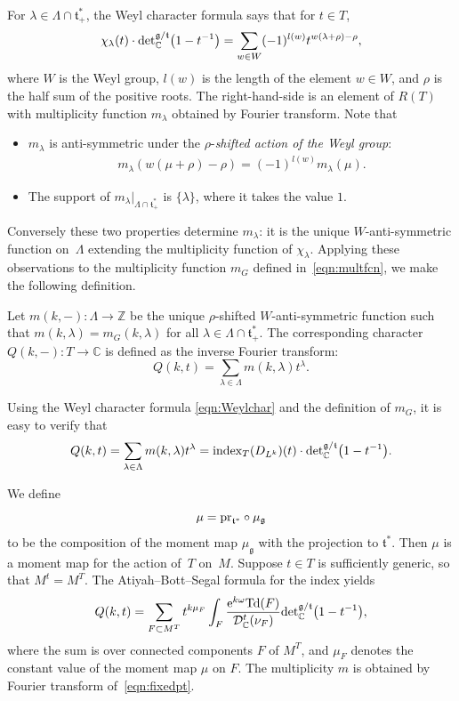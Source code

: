\documentclass[11pt]{article}
\numberwithin{equation}{section}
\newcommand{\tn}[1]{\textnormal{#1}}
\def\g{\ensuremath{\mathfrak{g}}}
\def\t{\ensuremath{\mathfrak{t}}}
\def\bC{\ensuremath{\mathbb{C}}}
\def\bZ{\ensuremath{\mathbb{Z}}}
\def\pr{\ensuremath{\textnormal{pr}}}
\def\index{\ensuremath{\textnormal{index}}}
\def\Td{\ensuremath{\textnormal{Td}}}
\def\calDC{\ensuremath{\mathcal{D}_{\bC}}}
\def\de{\ensuremath{\tn{det}_\bC}}
\begin{document}
For $\lambda \in \Lambda\cap \t_+^\ast$, the Weyl character formula says that for $t \in T$,
\begin{gather}\label{eqn:Weylchar}
\chi_\lambda(t) \cdot \de^{\g/\t}\big(1-t^{-1}\big)=\sum_{w\in W} (-1)^{l(w)}t^{w(\lambda+\rho)-\rho},
\end{gather}
where $W$ is the Weyl group, $l(w)$ is the length of the element $w \in W$, and $\rho$ is the half sum of the positive roots. The right-hand-side is an element of $R(T)$ with multiplicity function $m_\lambda$ obtained by Fourier transform. Note that
\begin{itemize}\itemsep=0pt
\item $m_\lambda$ is anti-symmetric under the $\rho$-\emph{shifted action of the Weyl group}:
\begin{gather*}%
m_\lambda(w(\mu+\rho)-\rho)=(-1)^{l(w)}m_\lambda(\mu).
\end{gather*}
\item The support of $m_\lambda|_{\Lambda \cap \t_+^\ast}$ is $\{\lambda\}$, where it takes the value $1$.
\end{itemize}
Conversely these two properties determine $m_\lambda$: it is the unique $W$-anti-symmetric function on~$\Lambda$ extending the multiplicity function of $\chi_\lambda$. Applying these observations to the multiplicity function $m_G$ defined in~\eqref{eqn:multfcn}, we make the following definition.
\begin{Definition}Let $m(k,-)\colon \Lambda \rightarrow \bZ$ be the unique $\rho$-shifted $W$-anti-symmetric function such that $m(k,\lambda)=m_G(k,\lambda)$ for all $\lambda \in \Lambda \cap \t_+^\ast$. The corresponding character $Q(k,-) \colon T \rightarrow \bC$ is defined as the inverse Fourier transform:
\[ Q(k,t)=\sum_{\lambda \in \Lambda} m(k,\lambda)t^\lambda.\]
\end{Definition}

Using the Weyl character formula \eqref{eqn:Weylchar} and the definition of $m_G$, it is easy to verify that
\begin{gather*}%
Q(k,t)=\sum_{\lambda \in \Lambda} m(k,\lambda)t^\lambda=\index_T(D_{L^k})(t)\cdot \de^{\g/\t}\big(1-t^{-1}\big).
\end{gather*}

We define
\[ \mu=\pr_{\t^\ast}\circ \mu_\g \]
to be the composition of the moment map $\mu_\g$ with the projection to $\t^\ast$. Then $\mu$ is a moment map for the action of~$T$ on~$M$. Suppose $t\in T$ is sufficiently generic, so that $M^t=M^T$. The Atiyah--Bott--Segal formula for the index yields
\begin{gather}\label{eqn:fixedpt}
Q(k,t)=\sum_{F \subset M^T}t^{k\mu_F}\int_F \frac{{\rm e}^{k\omega}\Td(F)}{\calDC^t(\nu_F)}\de^{\g/\t}\big(1-t^{-1}\big),
\end{gather}
where the sum is over connected components $F$ of $M^T$, and $\mu_F$ denotes the constant value of the moment map $\mu$ on $F$. The multiplicity $m$ is obtained by Fourier transform of~\eqref{eqn:fixedpt}.
\end{document}
